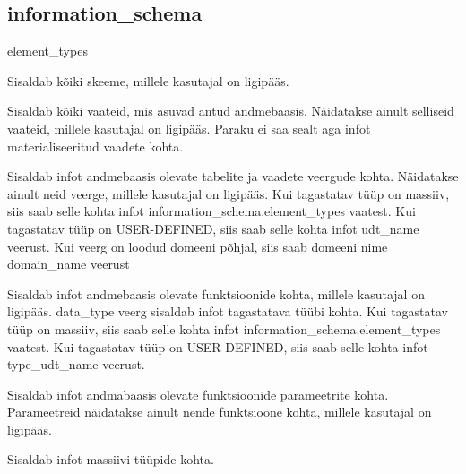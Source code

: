\documentclass[a4paper,12pt]{article} %
\begin{document}
\subsection*{information\_schema}
\begin{labeling}{element\_types}
\item [schemata] Sisaldab kõiki skeeme, millele kasutajal on ligipääs.
\item [views] Sisaldab kõiki vaateid, mis asuvad antud andmebaasis. Näidatakse ainult selliseid vaateid, millele kasutajal on ligipääs. Paraku ei saa sealt aga infot materialiseeritud vaadete kohta.
\item [columns] Sisaldab infot andmebaasis olevate tabelite ja vaadete veergude kohta. Näidatakse ainult neid veerge, millele kasutajal on ligipääs. Kui tagastatav tüüp on massiiv, siis saab selle kohta infot information\_schema.element\_types vaatest. Kui tagastatav tüüp on USER-DEFINED, siis saab selle kohta infot udt\_name veerust. Kui veerg on loodud domeeni põhjal, siis saab domeeni nime domain\_name veerust
\item [routines] Sisaldab infot andmebaasis olevate funktsioonide kohta, millele kasutajal on ligipääs. data\_type veerg sisaldab infot tagastatava tüübi kohta. Kui tagastatav tüüp on massiiv, siis saab selle kohta infot information\_schema.element\_types vaatest. Kui tagastatav tüüp on USER-DEFINED, siis saab selle kohta infot type\_udt\_name veerust.
\item [parameters] Sisaldab infot andmabaasis olevate funktsioonide parameetrite kohta. Parameetreid näidatakse ainult nende funktsioone kohta, millele kasutajal on ligipääs.
\item [element\_types] Sisaldab infot massiivi tüüpide kohta.
\end{labeling}
\cite{PostgreSQLInformationSchema}
\end{document}

